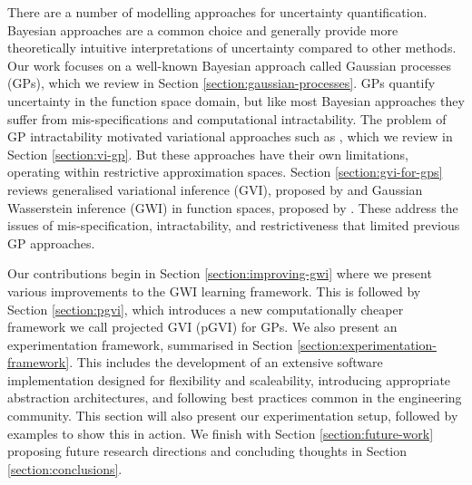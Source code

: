 \documentclass{article}
\numberwithin{equation}{section}
\begin{document}

There are a number of modelling approaches for uncertainty quantification. 
Bayesian approaches are a common choice and generally provide more theoretically intuitive interpretations of uncertainty compared to other methods. 
Our work focuses on a well-known Bayesian approach called Gaussian processes (GPs), which we review in Section \ref{section:gaussian-processes}.
GPs quantify uncertainty in the function space domain, but like most Bayesian approaches they suffer from mis-specifications and computational intractability. 
The problem of GP intractability motivated variational approaches such as \cite{titsias2009variational}, which we review in Section \ref{section:vi-gp}.
But these approaches have their own limitations, operating within restrictive approximation spaces.
Section \ref{section:gvi-for-gps} reviews generalised variational inference (GVI), proposed by \cite{knoblauch2022optimization} and Gaussian Wasserstein inference (GWI) in function spaces, proposed by \cite{wild2022generalized}. 
These address the issues of mis-specification, intractability, and restrictiveness that limited previous GP approaches. 

Our contributions begin in Section \ref{section:improving-gwi} where we present various improvements to the GWI learning framework.
This is followed by Section \ref{section:pgvi}, which introduces a new computationally cheaper framework we call projected GVI 
(pGVI) for GPs.
We also present an experimentation framework, summarised in Section \ref{section:experimentation-framework}. 
This includes the development of an extensive software implementation designed for flexibility and scaleability, introducing appropriate abstraction architectures, and following best practices common in the engineering community. 
This section will also present our experimentation setup, followed by examples to show this in action. We finish with Section \ref{section:future-work} proposing future research directions and concluding thoughts in Section \ref{section:conclusions}.
\end{document}
